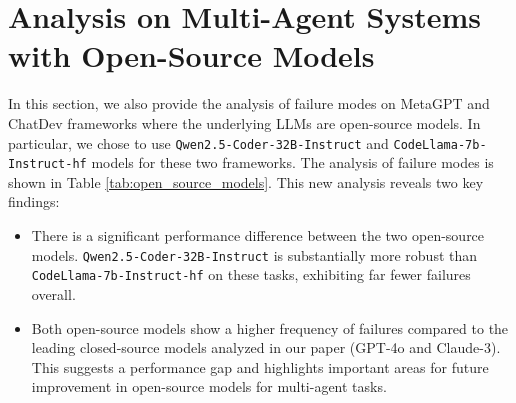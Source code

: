 \section{Analysis on Multi-Agent Systems with Open-Source Models}
\label{sec:analysis_on_opensource_models}

In this section, we also provide the analysis of failure modes on MetaGPT and ChatDev frameworks where the underlying LLMs are open-source models. In particular, we chose to use \verb|Qwen2.5-Coder-32B-Instruct| \cite{hui2024qwen2} and \verb|CodeLlama-7b-Instruct-hf| \cite{roziere2023code} models for these two frameworks. The analysis of failure modes is shown in Table \ref{tab:open_source_models}. This new analysis reveals two key findings:
\begin{itemize}
    \item There is a significant performance difference between the two open-source models. \verb|Qwen2.5-Coder-32B-Instruct| is substantially more robust than \verb|CodeLlama-7b-Instruct-hf| on these tasks, exhibiting far fewer failures overall.
    \item  Both open-source models show a higher frequency of failures compared to the leading closed-source models analyzed in our paper (GPT-4o and Claude-3). This suggests a performance gap and highlights important areas for future improvement in open-source models for multi-agent tasks.
\end{itemize}

